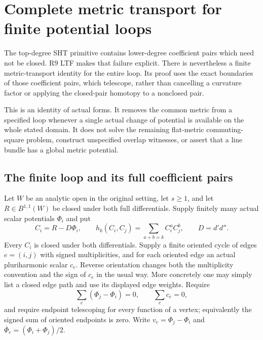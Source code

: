 \section{Complete metric transport for finite potential loops}
\label{sec:r10-complete-loop-metric-transport}

The top-degree SHT primitive contains lower-degree coefficient pairs
which need not be closed.  R9 LTF makes that failure explicit.  There
is nevertheless a finite metric-transport identity for the entire
loop.  Its proof uses the exact boundaries of those coefficient pairs,
which telescope, rather than cancelling a curvature factor or applying
the closed-pair homotopy to a nonclosed pair.

This is an identity of actual forms.  It removes the common metric
from a specified loop whenever a single actual change of potential is
available on the whole stated domain.  It does not solve the remaining
flat-metric commuting-square problem, construct unspecified overlap
witnesses, or assert that a line bundle has a global metric potential.

\subsection{The finite loop and its full coefficient pairs}

Let $W$ be an analytic open in the original setting, let $s\ge1$, and
let $R\in B^{1,1}(W)$ be closed under both full differentials.  Supply
finitely many actual scalar potentials $\Phi_i$ and put
\[
 C_i=R-D\Phi_i,\qquad
 h_k(C_i,C_j)=\sum_{a+b=k}C_i^aC_j^b,\qquad D=d'd''.
 \tag{MT1}
\]
Every $C_i$ is closed under both differentials.  Supply a finite
oriented cycle of edges $e=(i,j)$ with signed multiplicities, and for
each oriented edge an actual pluriharmonic scalar $c_e$.  Reverse
orientation changes both the multiplicity convention and the sign of
$c_e$ in the usual way.  More concretely one may simply list a closed
edge path and use its displayed edge weights.  Require
\[
 \sum_e (\Phi_j-\Phi_i)=0,\qquad
 \sum_e c_e=0,
 \tag{MT2}
\]
and require endpoint telescoping for every function of a vertex;
equivalently the signed sum of oriented endpoints is zero.  Write
$v_e=\Phi_j-\Phi_i$ and $\overline\Phi_e=(\Phi_i+\Phi_j)/2$.

